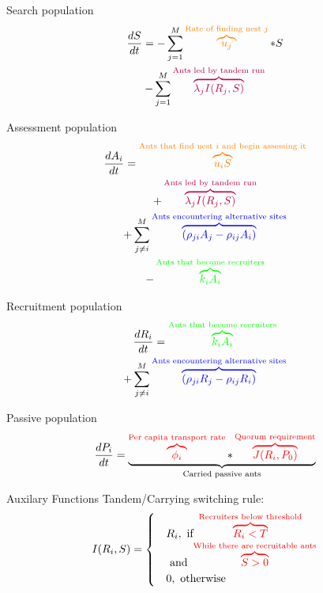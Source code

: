 \documentclass{beamer}
\makeatletter
\def\mcolor#1#{\@mcolor{#1}}
\def\@mcolor#1#2#3{%
  \protect\leavevmode
  \begingroup
    \color#1{#2}#3%
  \endgroup
}
\newcommand{\annotate}[3]{
\mcolor{#1}{\overbrace{#3}^\text{#2}}
}
\makeatother
\begin{document}
  \begin{frame}{Search population}
      \Large
      \begin{multline}
      \frac{dS}{dt} = - \sum_{j=1}^M \annotate{orange}{Rate of finding nest $j$}{u_j}*S \\  
      - \sum_{j=1}^M \annotate{purple}{Ants led by tandem run}{\lambda_jI(R_j, S)} 
      \end{multline}
  \end{frame}
  \begin{frame}{Assessment population}
      \Large
      \begin{multline}
      \frac{dA_i}{dt} = \annotate{orange}{Ants that find nest $i$ and begin assessing it}{u_iS} \\ 
      + \annotate{purple}{Ants led by tandem run}{\lambda_jI(R_j, S)} \\
      + \sum_{j \neq i}^M \annotate{blue}{Ants encountering alternative sites}{(\rho_{ji}A_j - \rho_{ij}A_i)} \\ 
      - \annotate{green}{Ants that become recruiters}{k_iA_i} \\
      \end{multline}
  \end{frame}
  \begin{frame}{Recruitment population}
      \Large
      \begin{multline}
          \frac{dR_i}{dt} = \annotate{green}{Ants that become recruiters}{k_iA_i} \\
          + \sum_{j \neq i}^M \annotate{blue}{Ants encountering alternative sites}{(\rho_{ji}R_j - \rho_{ij}R_i)}
      \end{multline}
  \end{frame}
  \begin{frame}{Passive population}
      \Large
      \begin{equation}
          \frac{dP_i}{dt} = \underbrace{\annotate{red}{Per capita transport rate}{\phi_i} * \annotate{red}{Quorum requirement}{J(R_i, P_0)}}_\text{Carried passive ants}
      \end{equation}
  \end{frame}
  \begin{frame}{Auxilary Functions}
      \Large
      Tandem/Carrying switching rule:
      \begin{equation}
          I(R_i, S) = 
          \begin{cases}
              & R_i,  \text{ if } \annotate{red}{Recruiters below threshold}{R_i < T} \\
              &       \text{     and } \annotate{red}{While there are recruitable ants}{S > 0}\\
              & 0, \text{ otherwise}
          \end{cases}
      \end{equation}
  \end{frame}
\end{document}
